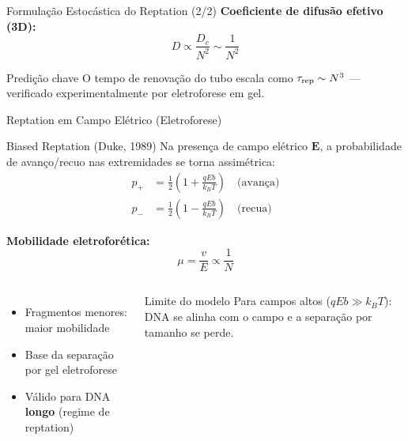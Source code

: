 \begin{frame}{Formulação Estocástica do Reptation (2/2)}
\textbf{Coeficiente de difusão efetivo (3D):}
\begin{equation*}
D \propto \frac{D_c}{N^2} \sim \frac{1}{N^2}
\end{equation*}

\vspace{0.4cm}

\begin{exampleblock}{Predição chave}
O tempo de renovação do tubo escala como $\tau_{\rm rep} \sim N^3$ — verificado experimentalmente por eletroforese em gel.
\end{exampleblock}

\vspace{0.4cm}

\end{frame}

\begin{frame}[shrink=15]{Reptation em Campo Elétrico (Eletroforese)}
\begin{block}{Biased Reptation (Duke, 1989)}
Na presença de campo elétrico $\mathbf{E}$, a probabilidade de avanço/recuo nas extremidades se torna assimétrica:
\begin{align*}
p_+ &= \frac{1}{2}\left(1 + \frac{qEb}{k_BT}\right) \quad \text{(avança)}\\
p_- &= \frac{1}{2}\left(1 - \frac{qEb}{k_BT}\right) \quad \text{(recua)}
\end{align*}
\end{block}

\textbf{Mobilidade eletroforética:}
\begin{equation*}
\mu = \frac{v}{E} \propto \frac{1}{N}
\end{equation*}

\begin{columns}
\begin{itemize}
    \item Fragmentos menores: maior mobilidade
    \item Base da separação por gel eletroforese
    \item Válido para DNA \textbf{longo} (regime de reptation)
\end{itemize}
\begin{alertblock}{Limite do modelo}
Para campos altos ($qEb \gg k_BT$): DNA se alinha com o campo e a separação por tamanho se perde.
\end{alertblock}
\end{columns}
\end{frame}

